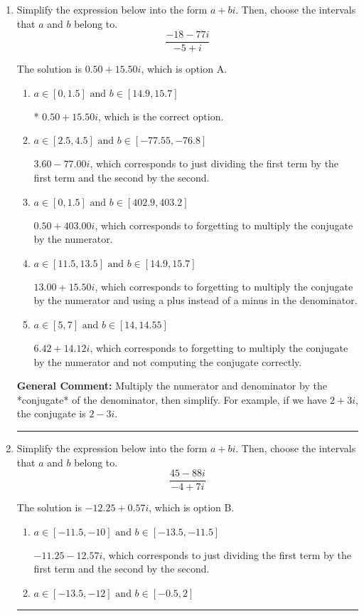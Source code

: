 \documentclass{extbook}[14pt]
\newcommand{\litem}[1]{\item #1

\rule{\textwidth}{0.4pt}}
\begin{document}
\begin{enumerate}\litem{
Simplify the expression below into the form $a+bi$. Then, choose the intervals that $a$ and $b$ belong to.
\[ \frac{-18 - 77 i}{-5 + i} \]

The solution is \( 0.50  + 15.50 i \), which is option A.\begin{enumerate}[label=\Alph*.]
\item \( a \in [0, 1.5] \text{ and } b \in [14.9, 15.7] \)

* $0.50  + 15.50 i$, which is the correct option.
\item \( a \in [2.5, 4.5] \text{ and } b \in [-77.55, -76.8] \)

 $3.60  - 77.00 i$, which corresponds to just dividing the first term by the first term and the second by the second.
\item \( a \in [0, 1.5] \text{ and } b \in [402.9, 403.2] \)

 $0.50  + 403.00 i$, which corresponds to forgetting to multiply the conjugate by the numerator.
\item \( a \in [11.5, 13.5] \text{ and } b \in [14.9, 15.7] \)

 $13.00  + 15.50 i$, which corresponds to forgetting to multiply the conjugate by the numerator and using a plus instead of a minus in the denominator.
\item \( a \in [5, 7] \text{ and } b \in [14, 14.55] \)

 $6.42  + 14.12 i$, which corresponds to forgetting to multiply the conjugate by the numerator and not computing the conjugate correctly.
\end{enumerate}

\textbf{General Comment:} Multiply the numerator and denominator by the *conjugate* of the denominator, then simplify. For example, if we have $2+3i$, the conjugate is $2-3i$.
}
\litem{
Simplify the expression below into the form $a+bi$. Then, choose the intervals that $a$ and $b$ belong to.
\[ \frac{45 - 88 i}{-4 + 7 i} \]

The solution is \( -12.25  + 0.57 i \), which is option B.\begin{enumerate}[label=\Alph*.]
\item \( a \in [-11.5, -10] \text{ and } b \in [-13.5, -11.5] \)

 $-11.25  - 12.57 i$, which corresponds to just dividing the first term by the first term and the second by the second.
\item \( a \in [-13.5, -12] \text{ and } b \in [-0.5, 2] \)


\end{enumerate}}
\end{enumerate}
\end{document}
